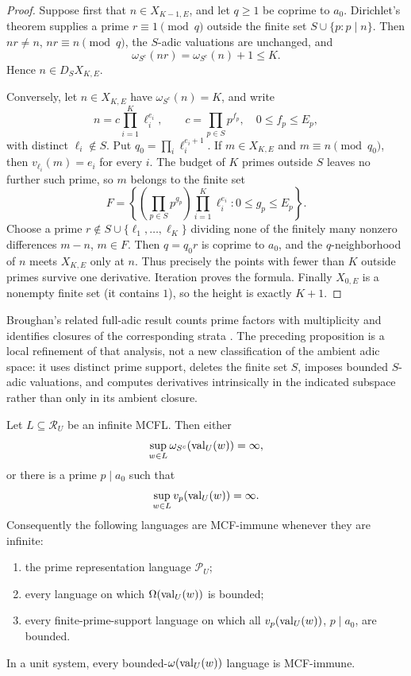 \begin{proof}
  Suppose first that \(n\in X_{K-1,E}\), and let \(q\ge1\) be coprime
  to \(a_0\). Dirichlet's theorem supplies a prime
  \(r\equiv1\pmod q\) outside the finite set \(S\cup\{p:p\mid n\}\).
  Then \(nr\ne n\), \(nr\equiv n\pmod q\), the \(S\)-adic valuations
  are unchanged, and
  \[
    \omega_{S^c}(nr)=\omega_{S^c}(n)+1\le K.
  \]
  Hence \(n\in D_SX_{K,E}\).

  Conversely, let \(n\in X_{K,E}\) have
  \(\omega_{S^c}(n)=K\), and write
  \[
    n=c\prod_{i=1}^K\ell_i^{e_i},
    \qquad c=\prod_{p\in S}p^{f_p},\quad 0\le f_p\le E_p,
  \]
  with distinct \(\ell_i\notin S\). Put
  \(q_0=\prod_i\ell_i^{e_i+1}\). If \(m\in X_{K,E}\) and
  \(m\equiv n\pmod {q_0}\), then
  \(v_{\ell_i}(m)=e_i\) for every \(i\). The budget of \(K\) primes
  outside \(S\) leaves no further such prime, so \(m\) belongs to the
  finite set
  \[
    F=\left\{
      \left(\prod_{p\in S}p^{g_p}\right)
      \prod_{i=1}^K\ell_i^{e_i}:
      0\le g_p\le E_p
    \right\}.
  \]
  Choose a prime \(r\notin S\cup\{\ell_1,\ldots,\ell_K\}\) dividing
  none of the finitely many nonzero differences \(m-n\), \(m\in F\).
  Then \(q=q_0r\) is coprime to \(a_0\), and the \(q\)-neighborhood of
  \(n\) meets \(X_{K,E}\) only at \(n\). Thus precisely the points with
  fewer than \(K\) outside primes survive one derivative. Iteration
  proves the formula. Finally \(X_{0,E}\) is a nonempty finite set (it
  contains \(1\)), so the height is exactly \(K+1\).
\end{proof}

Broughan's related full-adic result counts prime factors with
multiplicity and identifies closures of the corresponding strata
\cite[Theorem~4.3]{Broughan2003}. The preceding proposition is a local
refinement of that analysis, not a new classification of the ambient adic
space: it uses distinct prime support, deletes the finite set \(S\), imposes
bounded \(S\)-adic valuations, and computes derivatives intrinsically in
the indicated subspace rather than only in its ambient closure.

\begin{theorem}
  \label{thm:nonunit-mcfl-escape-dichotomy}
  Let \(L\subseteq\mathcal R_U\) be an infinite MCFL. Then either
  \[
    \sup_{w\in L}\omega_{S^c}(\operatorname{val}_U(w))=\infty,
  \]
  or there is a prime \(p\mid a_0\) such that
  \[
    \sup_{w\in L}v_p(\operatorname{val}_U(w))=\infty.
  \]
  Consequently the following languages are MCF-immune whenever they are
  infinite:
  \begin{enumerate}[label=\textup{(\roman*)}]
    \item the prime representation language \(\mathcal P_U\);
    \item every language on which \(\Omega(\operatorname{val}_U(w))\) is bounded;
    \item every finite-prime-support language on which all
    \(v_p(\operatorname{val}_U(w))\), \(p\mid a_0\), are bounded.
  \end{enumerate}
  In a unit system, every bounded-\(\omega(\operatorname{val}_U(w))\) language is
  MCF-immune.
\end{theorem}

